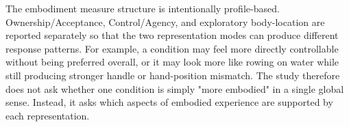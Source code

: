 The embodiment measure structure is intentionally profile-based.
Ownership/Acceptance, Control/Agency, and exploratory body-location are reported separately so that the two representation modes can produce different response patterns.
For example, a condition may feel more directly controllable without being preferred overall, or it may look more like rowing on water while still producing stronger handle or hand-position mismatch.
The study therefore does not ask whether one condition is simply "more embodied" in a single global sense.
Instead, it asks which aspects of embodied experience are supported by each representation.